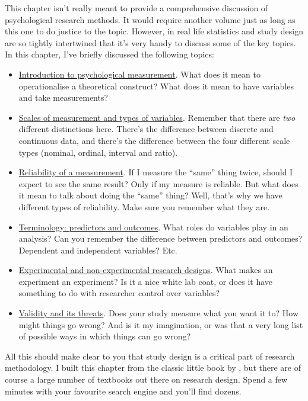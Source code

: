 \documentclass[
]{book}
\providecommand{\tightlist}{%
  \setlength{\itemsep}{0pt}\setlength{\parskip}{0pt}}
\begin{document}
This chapter isn't really meant to provide a comprehensive discussion of psychological research methods. It would require another volume just as long as this one to do justice to the topic. However, in real life statistics and study design are so tightly intertwined that it's very handy to discuss some of the key topics. In this chapter, I've briefly discussed the following topics:

\begin{itemize}
\tightlist
\item
  \protect\hyperlink{measurement}{Introduction to psychological measurement}. What does it mean to operationalise a theoretical construct? What does it mean to have variables and take measurements?
\item
  \protect\hyperlink{scales}{Scales of measurement and types of variables}. Remember that there are \emph{two} different distinctions here. There's the difference between discrete and continuous data, and there's the difference between the four different scale types (nominal, ordinal, interval and ratio).
\item
  \protect\hyperlink{reliability}{Reliability of a measurement}. If I measure the ``same'' thing twice, should I expect to see the same result? Only if my measure is reliable. But what does it mean to talk about doing the ``same'' thing? Well, that's why we have different types of reliability. Make sure you remember what they are.
\item
  \protect\hyperlink{ivdv}{Terminology: predictors and outcomes}. What roles do variables play in an analysis? Can you remember the difference between predictors and outcomes? Dependent and independent variables? Etc.
\item
  \protect\hyperlink{researchdesigns}{Experimental and non-experimental research designs}. What makes an experiment an experiment? Is it a nice white lab coat, or does it have something to do with researcher control over variables?
\item
  \protect\hyperlink{validity}{Validity and its threats}. Does your study measure what you want it to? How might things go wrong? And is it my imagination, or was that a very long list of possible ways in which things can go wrong?
\end{itemize}

All this should make clear to you that study design is a critical part of research methodology. I built this chapter from the classic little book by \citet{Campbell1963}, but there are of course a large number of textbooks out there on research design. Spend a few minutes with your favourite search engine and you'll find dozens.
\end{document}
